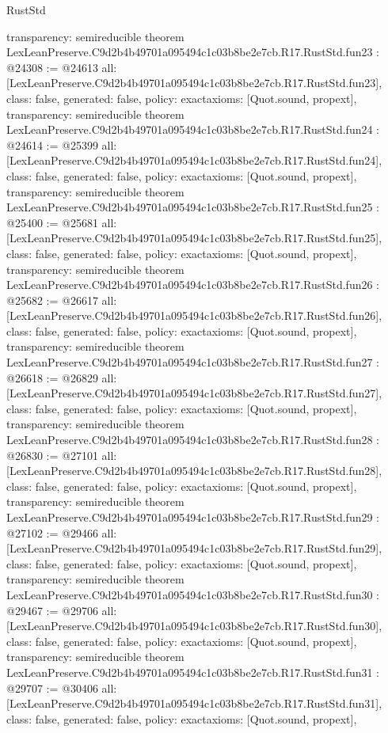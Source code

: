 \begin{lexlean}{RustStd}
\begin{coremodule}
{  transparency: semireducible
}
theorem LexLeanPreserve.C9d2b4b49701a095494c1c03b8be2e7cb.R17.RustStd.fun23 : @24308 := @24613 {
  all: [LexLeanPreserve.C9d2b4b49701a095494c1c03b8be2e7cb.R17.RustStd.fun23],
  class: false,
  generated: false,
  policy: exact{axioms: [Quot.sound, propext]},
  transparency: semireducible
}
theorem LexLeanPreserve.C9d2b4b49701a095494c1c03b8be2e7cb.R17.RustStd.fun24 : @24614 := @25399 {
  all: [LexLeanPreserve.C9d2b4b49701a095494c1c03b8be2e7cb.R17.RustStd.fun24],
  class: false,
  generated: false,
  policy: exact{axioms: [Quot.sound, propext]},
  transparency: semireducible
}
theorem LexLeanPreserve.C9d2b4b49701a095494c1c03b8be2e7cb.R17.RustStd.fun25 : @25400 := @25681 {
  all: [LexLeanPreserve.C9d2b4b49701a095494c1c03b8be2e7cb.R17.RustStd.fun25],
  class: false,
  generated: false,
  policy: exact{axioms: [Quot.sound, propext]},
  transparency: semireducible
}
theorem LexLeanPreserve.C9d2b4b49701a095494c1c03b8be2e7cb.R17.RustStd.fun26 : @25682 := @26617 {
  all: [LexLeanPreserve.C9d2b4b49701a095494c1c03b8be2e7cb.R17.RustStd.fun26],
  class: false,
  generated: false,
  policy: exact{axioms: [Quot.sound, propext]},
  transparency: semireducible
}
theorem LexLeanPreserve.C9d2b4b49701a095494c1c03b8be2e7cb.R17.RustStd.fun27 : @26618 := @26829 {
  all: [LexLeanPreserve.C9d2b4b49701a095494c1c03b8be2e7cb.R17.RustStd.fun27],
  class: false,
  generated: false,
  policy: exact{axioms: [Quot.sound, propext]},
  transparency: semireducible
}
theorem LexLeanPreserve.C9d2b4b49701a095494c1c03b8be2e7cb.R17.RustStd.fun28 : @26830 := @27101 {
  all: [LexLeanPreserve.C9d2b4b49701a095494c1c03b8be2e7cb.R17.RustStd.fun28],
  class: false,
  generated: false,
  policy: exact{axioms: [Quot.sound, propext]},
  transparency: semireducible
}
theorem LexLeanPreserve.C9d2b4b49701a095494c1c03b8be2e7cb.R17.RustStd.fun29 : @27102 := @29466 {
  all: [LexLeanPreserve.C9d2b4b49701a095494c1c03b8be2e7cb.R17.RustStd.fun29],
  class: false,
  generated: false,
  policy: exact{axioms: [Quot.sound, propext]},
  transparency: semireducible
}
theorem LexLeanPreserve.C9d2b4b49701a095494c1c03b8be2e7cb.R17.RustStd.fun30 : @29467 := @29706 {
  all: [LexLeanPreserve.C9d2b4b49701a095494c1c03b8be2e7cb.R17.RustStd.fun30],
  class: false,
  generated: false,
  policy: exact{axioms: [Quot.sound, propext]},
  transparency: semireducible
}
theorem LexLeanPreserve.C9d2b4b49701a095494c1c03b8be2e7cb.R17.RustStd.fun31 : @29707 := @30406 {
  all: [LexLeanPreserve.C9d2b4b49701a095494c1c03b8be2e7cb.R17.RustStd.fun31],
  class: false,
  generated: false,
  policy: exact{axioms: [Quot.sound, propext]},
}
\end{coremodule}
\end{lexlean}
